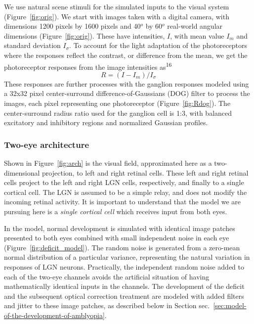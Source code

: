 \documentclass[
]{article}
\begin{document}
We use natural scene stimuli for the simulated inputs to the visual
system (Figure~\ref{fig:orig}). We start with images taken with a
digital camera, with dimensions 1200 pixels by 1600 pixels and 40\(^o\)
by 60\(^o\) real-world angular dimensions (Figure~\ref{fig:orig}). These
have intensities, \(I\), with mean value \(I_m\) and standard deviation
\(I_\sigma\). To account for the light adaptation of the photoreceptors
where the responses reflect the contrast, or difference from the mean,
we get the photoreceptor responses from the image intensities
as\textsuperscript{16} \[
R=(I-I_m)/I_\sigma
\] These responses are further processes with the ganglion responses
modeled using a 32x32 pixel center-surround difference-of-Gaussians
(DOG) filter to process the images, each pixel representing one
photoreceptor (Figure~\ref{fig:Rdog}). The center-surround radius ratio
used for the ganglion cell is 1:3, with balanced excitatory and
inhibitory regions and normalized Gaussian profiles.

\subsubsection{Two-eye architecture}\label{sec:two-eye-architecture}

Shown in Figure~\ref{fig:arch} is the visual field, approximated here as
a two-dimensional projection, to left and right retinal cells. These
left and right retinal cells project to the left and right LGN cells,
respectively, and finally to a single cortical cell. The LGN is assumed
to be a simple relay, and does not modify the incoming retinal activity.
It is important to understand that the model we are pursuing here is a
\emph{single cortical cell} which receives input from both eyes.

In the model, normal development is simulated with identical image
patches presented to both eyes combined with small independent noise in
each eye (Figure~\ref{fig:deficit_model}). The random noise is generated
from a zero-mean normal distribution of a particular variance,
representing the natural variation in responses of LGN neurons.
Practically, the independent random noise added to each of the two-eye
channels avoids the artificial situation of having mathematically
identical inputs in the channels. The development of the deficit and the
subsequent optical correction treatment are modeled with added filters
and jitter to these image patches, as described below in Section
sec.~\ref{sec:model-of-the-development-of-amblyopia}.
\end{document}
